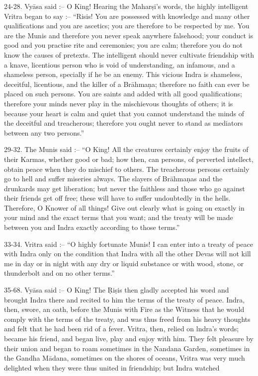24-28. Vy\=asa said :-- O King! Hearing the Mahar\d{s}i's words, the highly intelligent Vritra began to say :-- ``Risis! You are possessed with knowledge and many other qualifications and you are ascetics; you are therefore to be respected by me. You are the Munis and therefore you never speak anywhere falsehood; your conduct is good and you practise rite and ceremonies; you are calm; therefore you do not know the causes of pretexts. The intelligent should never cultivate friendship with a knave, licentious person who is void of understanding, an infamous, and a shameless person, specially if he be an enemy. This vicious Indra is shameless, deceitful, licentious, and the killer of a Br\=ahma\d{n}a; therefore no faith can ever be placed on such persons. You are saints and added with all good qualifications; therefore your minds never play in the mischievous thoughts of others; it is because your heart is calm and quiet that you cannot understand the minds of the deceitful and treacherous; therefore you ought never to stand as mediators between any two persons.''

29-32. The Munis said :-- ``O King! All the creatures certainly enjoy the fruits of their Karmas, whether good or bad; how then, can persons, of perverted intellect, obtain peace when they do mischief to others. The treacherous persons certainly go to hell and suffer miseries always. The slayers of Br\=ahma\d{n}as and the drunkards may get liberation; but never the faithless and those who go against their friends get off free; these will have to suffer undoubtedly in the hells. Therefore, O Knower of all things! Give out clearly what is going on exactly in your mind and the exact terms that you want; and the treaty will be made between you and Indra exactly according to those terms.''

33-34. Vritra said :-- ``O highly fortunate Munis! I can enter into a treaty of peace with Indra only on the condition that Indra with all the other Devas will not kill me in day or in night with any dry or liquid substance or with wood, stone, or thunderbolt and on no other terms.''

35-68. Vy\=asa said :-- O King! The \d{R}i\d{s}is then gladly accepted his word and brought Indra there and recited to him the terms of the treaty of peace. Indra, then, swore, an oath, before the Munis with Fire as the Witness that he would comply with the terms of the treaty, and was thus freed from his heavy thoughts and felt that he had been rid of a fever. Vritra, then, relied on lndra's words; became his friend, and began live, play and enjoy with him. They felt pleasure by their union and began to roam sometimes in the Nandana Garden, sometimes in the Gandha M\=adana, sometimes on the shores of oceans, Vritra was very much delighted when they were thus united in friendship; but Indra watched

